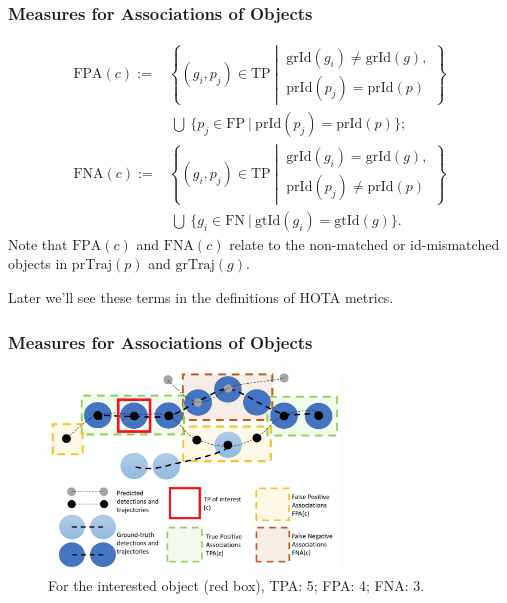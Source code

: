 \documentclass[slidetop, mathserif]{beamer}
\begin{document}
\begin{frame}
	\frametitle{Measures for Associations of Objects}
			
	\vspace{-20pt}
	\begin{align*}
		\text{FPA}(c) := &             
		\left\{(g_i, p_j)\in\text{TP}\ \left|\ 
		\begin{array}{c}
		\text{grId}(g_i) \neq \text{grId}(g), \\
		\text{prId}(p_j) = \text{prId}(p)
		\end{array}\right.
		\right\} \\
		                 & ~ \bigcup ~ 
		\Big\{p_j\in\text{FP}\ |\ 
		\text{prId}(p_j) = \text{prId}(p)
		\Big\}; \\
		\text{FNA}(c) := &             
		\left\{(g_i, p_j)\in\text{TP}\ \left|\ 
		\begin{array}{c}
		\text{grId}(g_i) = \text{grId}(g), \\
		\text{prId}(p_j) \neq \text{prId}(p)
		\end{array}\right.
		\right\} \\
		                 & ~ \bigcup ~ 
		\Big\{g_i\in\text{FN}\ |\ 
		\text{gtId}(g_i) = \text{gtId}(g)
		\Big\}.
	\end{align*}
	Note that $\text{FPA}(c)$ and $\text{FNA}(c)$ relate to the non-matched or id-mismatched
	objects in $\text{prTraj}(p)$ and $\text{grTraj}(g)$.
		
	Later we'll see these terms in the definitions of HOTA metrics.
			
\end{frame}

\begin{frame}
	\frametitle{Measures for Associations of Objects}
	\begin{figure}
		\includegraphics[width=220pt]{pics/fig8.png}
		\caption{For the interested object (red box), TPA: 5; FPA: 4; FNA: 3.}
	\end{figure}
\end{frame}
\end{document}
